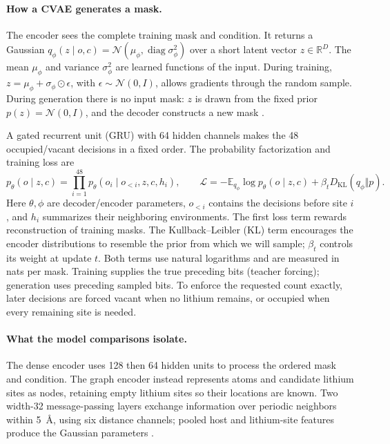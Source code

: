 \documentclass{article}
\newcommand{\KL}{D_{\mathrm{KL}}}
\newcommand{\E}{\mathbb E}
\begin{document}
\paragraph{How a CVAE generates a mask.}
The encoder sees the complete training mask and condition. It returns a Gaussian
$q_\phi(z\mid o,c)=\mathcal N(\mu_\phi,\operatorname{diag}\sigma_\phi^2)$
over a short latent vector $z\in\mathbb R^D$. The mean $\mu_\phi$ and variance
$\sigma_\phi^2$ are learned functions of the input. During training,
$z=\mu_\phi+\sigma_\phi\odot\epsilon$, with
$\epsilon\sim\mathcal N(0,I)$, allows gradients through the random sample.
During generation there is no input mask: $z$ is drawn from the fixed prior
$p(z)=\mathcal N(0,I)$, and the decoder constructs a new mask
\citep{kingma2014,sohn2015}.

A gated recurrent unit (GRU) with 64 hidden channels makes the 48 occupied/vacant
decisions in a fixed order. The probability factorization and training loss are
\begin{equation}
p_\theta(o\mid z,c)=\prod_{i=1}^{48}p_\theta(o_i\mid o_{<i},z,c,h_i),
\qquad
\mathcal L=-\E_{q_\phi}\log p_\theta(o\mid z,c)+\beta_t\KL(q_\phi\Vert p).
\label{eq:cvae}
\end{equation}
Here $\theta,\phi$ are decoder/encoder parameters, $o_{<i}$ contains the decisions
before site $i$, and $h_i$ summarizes their neighboring environments. The first
loss term rewards reconstruction of training masks. The Kullback--Leibler (KL)
term encourages the encoder distributions to resemble the prior from which we
will sample; $\beta_t$ controls its weight at update $t$. Both terms use natural
logarithms and are measured in nats per mask. Training supplies the true preceding
bits (teacher forcing); generation uses preceding sampled bits. To enforce the
requested count exactly, later decisions are forced vacant when no lithium
remains, or occupied when every remaining site is needed.

\paragraph{What the model comparisons isolate.}
The dense encoder uses 128 then 64 hidden units to process the ordered mask and
condition. The graph encoder instead represents atoms and candidate lithium
sites as nodes, retaining empty lithium sites so their locations are known.
Two width-32 message-passing layers exchange information over periodic neighbors
within 5~\AA, using six distance channels; pooled host and lithium-site features
produce the Gaussian parameters \citep{gilmer2017}.
\end{document}
